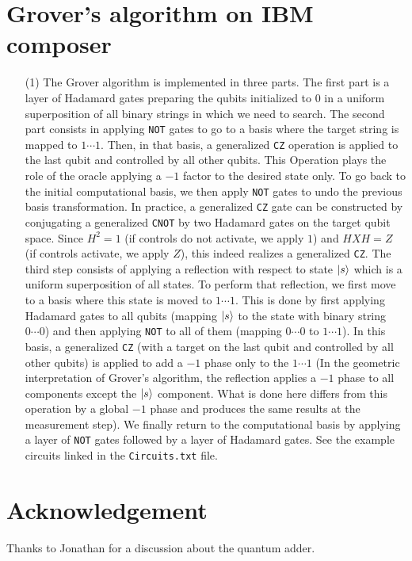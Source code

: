 \documentclass[10pt, a4paper]{article}
\begin{document}
{\newpage

\section{Grover's algorithm on IBM composer}

\begin{enumerate}
  \item[(1)] The Grover algorithm is implemented in three parts. The first part is a layer of Hadamard gates preparing the qubits initialized to $0$ in a uniform superposition of all binary strings in which we need to search. The second part consists in applying \verb|NOT| gates to go to a basis where the target string is mapped to $1\cdots 1$. Then, in that basis, a generalized \verb|CZ| operation is applied to the last qubit and controlled by all other qubits. This Operation plays the role of the oracle applying a $-1$ factor to the desired state only. To go back to the initial computational basis, we then apply \verb|NOT| gates to undo the previous basis transformation. In practice, a generalized \verb|CZ| gate can be constructed by conjugating a generalized \verb|CNOT| by two Hadamard gates on the target qubit space. Since $H^2 = 1$ (if controls do not activate, we apply $1$) and $HXH = Z$ (if controls activate, we apply $Z$), this indeed realizes a generalized \verb|CZ|. The third step consists of applying a reflection with respect to state $\ket{s}$ which is a uniform superposition of all states. To perform that reflection, we first move to a basis where this state is moved to $1\cdots 1$. This is done by first applying Hadamard gates to all qubits (mapping $\ket{s}$ to the state with binary string  $0 \cdots 0$) and then applying \verb|NOT| to all of them (mapping $0 \cdots 0$ to $1 \cdots 1$). In this basis, a generalized \verb|CZ| (with a target on the last qubit and controlled by all other qubits) is applied to add a $-1$ phase only to the $1 \cdots 1$ (In the geometric interpretation of Grover's algorithm, the reflection applies a $-1$ phase to all components except the $\ket{s}$ component. What is done here differs from this operation by a global $-1$ phase and produces the same results at the measurement step). We finally return to the computational basis by applying a layer of \verb|NOT| gates followed by a layer of Hadamard gates. See the example circuits linked in the \verb|Circuits.txt| file. 
\end{enumerate}

\section{Acknowledgement}

Thanks to Jonathan for a discussion about the quantum adder. 

}




\end{document}
